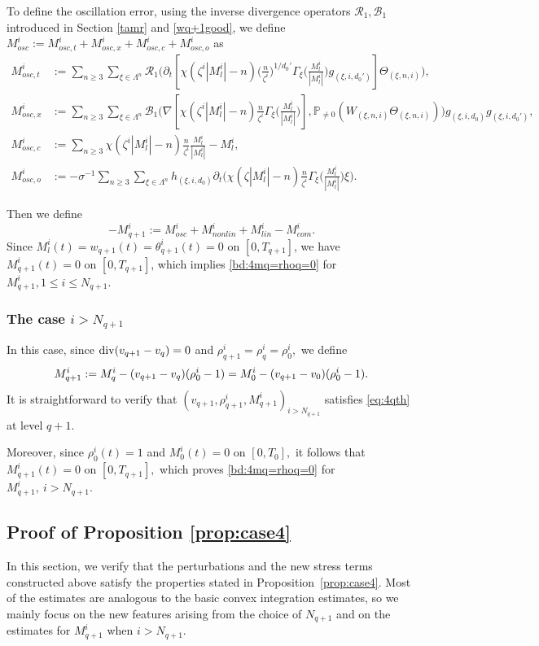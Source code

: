 \documentclass[UTF-8,reqno]{amsart}
\numberwithin{equation}{section}
\theoremstyle{definition}
\def\({{\Big(}}
\def\){{\Big)}}
\def\geq{\geqslant}
\def\leq{\leqslant}
\def\div{\mathord{{\rm div}}}
\def\({{\Big(}}
\def\){{\Big)}}
\def\geq{\geqslant}
\def\leq{\leqslant}
\def\div{\mathord{{\rm div}}}
\begin{document}
 To define the oscillation error,   using the inverse divergence operators  $\mathcal{R}_1,\mathcal{B}_1$ introduced in Section \ref{tamr} and  \eqref{wq+1good}, we   define $M^{i}_{osc}:=M^{i}_{osc,t}+M^{i}_{osc,x}+M^{i}_{osc,c}+M^{i}_{osc,o}$ as
\begin{align*}
   M^{i}_{osc,t}&:=\sum_{n\geq3}\sum_{\xi\in\Lambda^{n}}\mathcal{R}_{1}\(\partial_t[\chi(\zeta^{i}|M^{i}_l|-n)\(\frac{n}{\zeta^{i}}\)^{1/d_0'}\Gamma_{\xi}\(\frac{M^{i}_l}{|M^{i}_l|}\)g_{(\xi,i,d_0')}]\Theta_{(\xi,n,i)}\),\\
M^{i}_{osc,x}&:=\sum_{n\geq3}\sum_{\xi\in\Lambda^{n}}\mathcal{B}_{1}\(\nabla[\chi(\zeta^{i}|M^{i}_l|-n)\frac{n}{\zeta^{i}}\Gamma_{\xi}\(\frac{M^{i}_l}{|M^{i}_l|}\)],\mathbb{P}_{\neq0}(W_{(\xi,n,i)}\Theta_{(\xi,n,i)})\)g_{(\xi,i,d_0)}g_{(\xi,i,d_0')},\\
   M^{i}_{osc,c}&:=\sum_{n\geq3}\chi(\zeta^{i}|M^{i}_l|-n)\frac{n}{\zeta^{i}}\frac{M^{i}_l}{|M^{i}_l|}- M^{i}_l,\\
    M^{i}_{osc,o}&:=-\sigma^{-1}\sum_{n\geq3}\sum_{\xi\in\Lambda^{n}}h_{(\xi,i,d_0)}\partial_t\(\chi(\zeta|M_l^i|-n)\frac{n}{\zeta^i}\Gamma_{\xi}\(\frac{M_l^i}{|M_l^i|}\)\xi\).%
\end{align*}
 
Then we define 
$$-{M}^i_{q+1}:=M^{i}_{osc}+M^{i}_{nonlin}+M^{i}_{lin}-M_{com}^i.$$
Since $M^{i}_l(t)=w_{q+1}(t)=\theta^i_{q+1}(t)=0$ on $[0,T_{q+1}]$,  we have $M_{q+1}^i(t)=0$ on $[0,T_{q+1}]$, which implies  \eqref{bd:4mq=rhoq=0} for $M_{q+1}^i,1\leq i\leq N_{q+1}$. 

\subsubsection{The case $i>N_{q+1}$}
In this case, since
$
\div(v_{q+1}-v_q)=0
$
and
$
\rho_{q+1}^i=\rho_q^i=\rho_0^i,
$
we   define
\begin{align}
M_{q+1}^i
:=
M_q^i-(v_{q+1}-v_q)(\rho_0^i-1)
=
M_0^i-(v_{q+1}-v_0)(\rho_0^i-1).
\notag
\end{align}
It is straightforward to verify that
$
(v_{q+1},\rho_{q+1}^i,M_{q+1}^i)_{i>N_{q+1}}
$
satisfies \eqref{eq:4qth} at level $q+1$.

Moreover, since
$
\rho_0^i(t)=1
$
and
$
M_0^i(t)=0
$
on
$
[0,T_0],
$
it follows that
$
M_{q+1}^i(t)=0
$
on
$
[0,T_{q+1}],
$
which proves \eqref{bd:4mq=rhoq=0} for
$
M_{q+1}^i,
\ 
i>N_{q+1}.
$  



\subsection{Proof of Proposition \ref{prop:case4}}  In this section, we verify that the perturbations and the new stress terms constructed above satisfy the properties stated in Proposition~\ref{prop:case4}. 
Most of the estimates are analogous to the basic convex integration estimates, so we mainly focus on the new features arising from the choice of $N_{q+1}$ and on the estimates for $M_{q+1}^i$ when $i>N_{q+1}$.
\end{document}
